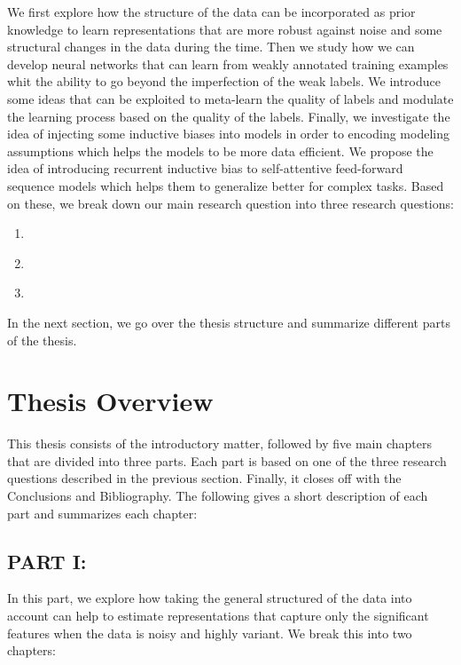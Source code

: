 We first explore how the structure of the data can be incorporated as prior knowledge to learn representations that are more robust against noise and some structural changes in the data during the time. 
%
Then we study how we can develop neural networks that can learn from weakly annotated training examples whit the ability to go beyond the imperfection of the weak labels. We introduce some ideas that can be exploited to meta-learn the quality of labels and modulate the learning process based on the quality of the labels.  
%
Finally, we investigate the idea of injecting some inductive biases into models in order to encoding modeling assumptions which helps the models to be more data efficient. We propose the idea of introducing recurrent inductive bias to self-attentive feed-forward sequence models which helps them to generalize better for complex tasks.  
%
Based on these, we break down our main research question into three research questions:

\begin{resqbox}
\begin{enumerate}
\item[\textbf{\resqname{p1}}] \emph{}
\item[\textbf{\resqname{p2}}] \emph{}
\item[\textbf{\resqname{p3}}] \emph{}
\end{enumerate}
\end{resqbox}

In the next section, we go over the thesis structure and summarize different parts of the thesis.

\section{Thesis Overview}
This thesis consists of the introductory matter, followed by five main
chapters that are divided into three parts. Each part is based on one of the three research questions described in the previous section. Finally, it closes off with the Conclusions and Bibliography. 
The following gives a short description of each part and summarizes each chapter: 

\subsection*{PART I: }
In this part, we explore how taking the general structured of the data into account can help to estimate representations that capture only the significant features when the data is noisy and highly variant. We break this into two chapters:

